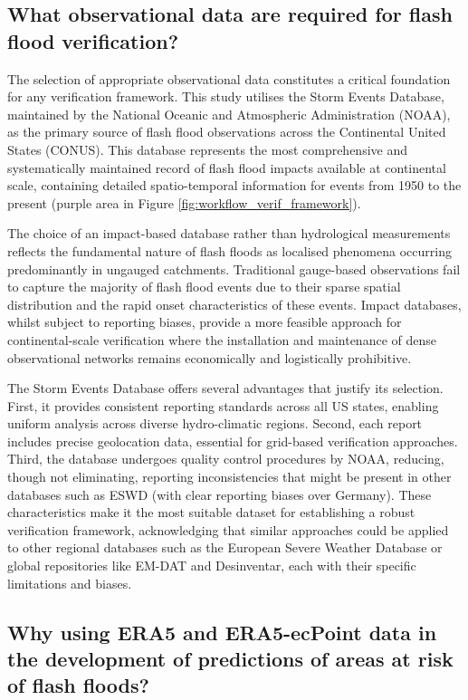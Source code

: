 \subsection{What observational data are required for flash flood verification?}

The selection of appropriate observational data constitutes a critical foundation for any verification framework. This study utilises the Storm Events Database, maintained by the National Oceanic and Atmospheric Administration (NOAA), as the primary source of flash flood observations across the Continental United States (CONUS). This database represents the most comprehensive and systematically maintained record of flash flood impacts available at continental scale, containing detailed spatio-temporal information for events from 1950 to the present (purple area in Figure \ref{fig:workflow_verif_framework}).

The choice of an impact-based database rather than hydrological measurements reflects the fundamental nature of flash floods as localised phenomena occurring predominantly in ungauged catchments. Traditional gauge-based observations fail to capture the majority of flash flood events due to their sparse spatial distribution and the rapid onset characteristics of these events. Impact databases, whilst subject to reporting biases, provide a more feasible approach for continental-scale verification where the installation and maintenance of dense observational networks remains economically and logistically prohibitive.

The Storm Events Database offers several advantages that justify its selection. First, it provides consistent reporting standards across all US states, enabling uniform analysis across diverse hydro-climatic regions. Second, each report includes precise geolocation data, essential for grid-based verification approaches. Third, the database undergoes quality control procedures by NOAA, reducing, though not eliminating, reporting inconsistencies that might be present in other databases such as ESWD (with clear reporting biases over Germany). These characteristics make it the most suitable dataset for establishing a robust verification framework, acknowledging that similar approaches could be applied to other regional databases such as the European Severe Weather Database or global repositories like EM-DAT and Desinventar, each with their specific limitations and biases.


\subsection{Why using ERA5 and ERA5-ecPoint data in the development of predictions of areas at risk of flash floods?}

